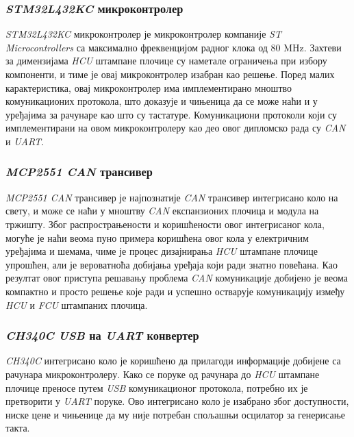 \documentclass{article}
\begin{document}
\subsubsection{\textit{STM32L432KC} микроконтролер} 
\textit{STM32L432KC} микроконтролер је микроконтролер компаније \textit{ST Microcontrollers} са максимално фреквенцијом радног клока од 80 MHz.
Захтеви за димензијама \textit{HCU} штампане плочице су наметале ограничења при избору компоненти, и тиме је овај микроконтролер 
изабран као решење. Поред малих карактеристика, овај микроконтролер има имплементирано мноштво комуникационих протокола, што 
доказује и чињеница да се може наћи и у уређајима за рачунаре као што су тастатуре. Комуникациони протоколи који су имплементирани на 
овом микроконтролеру као део овог дипломско рада су \textit{CAN} и \textit{UART}.

\subsubsection{\textit{MCP2551 CAN} трансивер} 
\textit{MCP2551 CAN} трансивер је најпознатије \textit{CAN} трансивер интегрисано коло на свету, и може се наћи у мноштву \textit{CAN}
експанзионих плочица и модула на тржишту. Због распрострањености и коришћености овог интегрисаног кола, могуће је наћи веома пуно примера коришћена 
овог кола у електричним уређајима и шемама, чиме је процес дизајнирања \textit{HCU} штампане плочице упрошћен, али је вероватноћа добијања 
уређаја који ради знатно повећана. Као резултат овог приступа решавању проблема \textit{CAN} комуникације добијено је веома 
компактно и просто решење које ради и успешно остварује комуникацију између \textit{HCU} и \textit{FCU} штампаних плочица.

\subsubsection{\textit{CH340C USB} на \textit{UART} конвертер} 
\textit{CH340C} интегрисано коло је коришћено да прилагоди информације добијене са рачунара микроконтролеру. 
Како се поруке од рачунара до \textit{HCU} штампане плочице преносе путем \textit{USB} комуникационог 
протокола, потребно их је претворити у \textit{UART} поруке. Ово интегрисано коло је изабрано због 
доступности, ниске цене и чињенице да му није потребан спољашњи осцилатор за генерисање такта.
\end{document}
